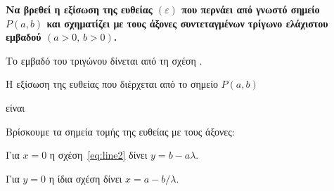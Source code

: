 \documentclass[a4paper,table]{report}
\begin{document}
\begin{mybox3}
\begin{problem}
  {\bfseries \boldmath Να βρεθεί η εξίσωση της ευθείας $ (\varepsilon)
    $ που περνάει από γνωστό σημείο $ P(a,b) $ και σχηματίζει με τους άξονες
  συντεταγμένων τρίγωνο ελάχιστου εμβαδού $ (a>0,\, b>0) $.}
\end{problem}
\end{mybox3}
\begin{solution}
\item {}

  Το εμβαδό του τριγώνου δίνεται από τη σχέση 
  . 

  Η εξίσωση της ευθείας που διέρχεται από το σημείο $ P(a,b) $ 

  είναι 

  Βρίσκουμε τα σημεία τομής της ευθείας με τους άξονες:

  Για $ x = 0 $ η σχέση~\eqref{eq:line2} δίνει $ y = b - a\lambda $.

  Για $ y = 0 $ η ίδια σχέση δίνει $ x = a - {b}/{\lambda} $.


\end{solution}
\end{document}
